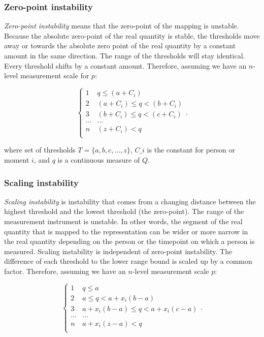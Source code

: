 \documentclass[utf8]{FrontiersinVancouver}
\begin{document}
\subsubsection{Zero-point instability}
\textit{Zero-point instability} means that the zero-point of the mapping is unstable. Because the absolute zero-point of the real quantity is stable, the thresholds move away or towards the absolute zero point of the real quantity by a constant amount in the same direction. The range of the thresholds will stay identical. Every threshold shifts by a constant amount. Therefore, assuming we have an $n$-level measurement scale for $p$:

\[
\begin{cases} 
    1 & q  \leq (a + C_{i})\\
    2 & (a + C_{i}) \leq q < (b + C_{i})\\
    3 & (b + C_{i})  \leq q < (c + C_{i})\\
    \ldots & \ldots\\    
    n & (z + C_{i})  < q\\
\end{cases}.
\]

where set of thresholds $T = \{a, b, c, \ldots, z\}$, $C\_{i}$ is the constant for person or moment $i$, and $q$ is a continuous measure of $Q$. 

\subsubsection{Scaling instability}
\textit{Scaling instability} is instability that comes from a changing distance between the highest threshold and the lowest threshold (the zero-point). The range of the measurement instrument is unstable. In other words, the segment of the real quantity that is mapped to the representation can be wider or more narrow in the real quantity depending on the person or the timepoint on which a person is measured. Scaling instability is independent of zero-point instability. The difference of each threshold to the lower range bound is scaled up by a common factor. Therefore, assuming we have an $n$-level measurement scale $p$:

\[
\begin{cases} 
    1 & q \leq a\\
    2 & a \leq q < a + x_{i}(b - a)\\
    3 & a + x_{i}(b - a) \leq q < a + x_{i}(c - a)\\
    \ldots & \ldots\\    
    n & a + x_{i}(z - a) < q\\
\end{cases}.
\]
\end{document}
